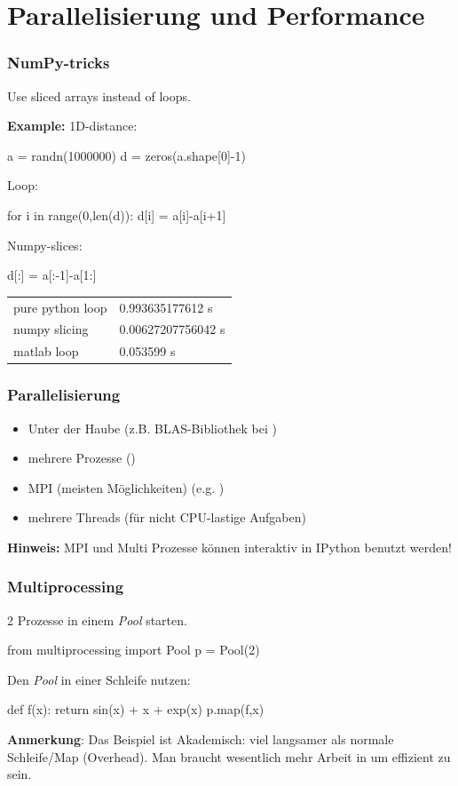 \documentclass[hyperref={xetex}]{beamer}
\begin{document}
\section{Parallelisierung und Performance}

\begin{frame}[fragile]\frametitle{NumPy-tricks}
Use sliced arrays instead of loops.

\textbf{Example:} 1D-distance:
\begin{pyin}
a = randn(1000000)
d = zeros(a.shape[0]-1)
\end{pyin}
Loop:
\begin{pyin}
for i in range(0,len(d)):
    d[i] = a[i]-a[i+1]
\end{pyin}
Numpy-slices:
\begin{pyin}
d[:] = a[:-1]-a[1:]
\end{pyin}
    \begin{tabular}[c]{ll}
pure python loop & 0.993635177612 s\\
numpy slicing & 0.00627207756042 s\\
matlab loop &  0.053599 s
  \end{tabular}
\end{frame}

\begin{frame}[fragile]\frametitle{Parallelisierung}
  \begin{itemize}
    \item Unter der Haube (z.B. BLAS-Bibliothek bei )
    \item mehrere Prozesse ()
    \item MPI (meisten Möglichkeiten) (e.g. )
    \item mehrere Threads (für nicht CPU-lastige Aufgaben)
  \end{itemize}
  \textbf{Hinweis:} MPI und Multi Prozesse können interaktiv in IPython benutzt werden!
\end{frame}

\begin{frame}[fragile]\frametitle{Multiprocessing}
  2 Prozesse in einem \textsl{Pool} starten.
  \begin{pyin}
from multiprocessing import Pool
p = Pool(2)
  \end{pyin}
  Den \textsl{Pool} in einer Schleife nutzen:
\begin{pyin}
def f(x):
    return sin(x) + x + exp(x)
p.map(f,x)  
\end{pyin}
\textbf{Anmerkung}: Das Beispiel ist Akademisch: viel langsamer als normale Schleife/Map (Overhead). 
Man braucht wesentlich mehr Arbeit in  um effizient zu sein.
\end{frame}
\end{document}
